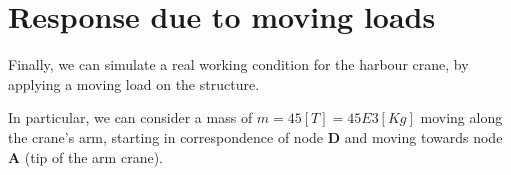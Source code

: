 \section{Response due to moving loads}
\label{sec:moving_loads_response}

Finally, we can simulate a real working condition for the harbour crane, by applying a moving load on the structure.

In particular, we can consider a mass of $m = 45[T] = 45E3 [Kg]$ moving along the crane's arm, starting in correspondence of node \textbf{D} and moving towards node \textbf{A} (tip of the arm crane).



% 

